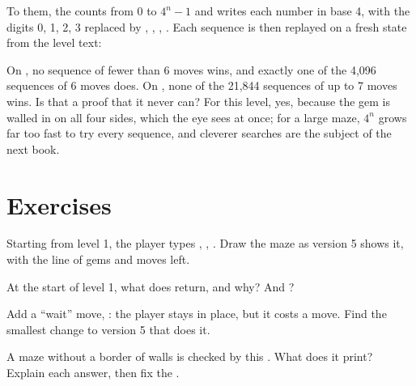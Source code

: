 To  them, the  counts from 0 to $4^n - 1$ and writes each number in
base 4, with the digits 0, 1, 2, 3 replaced by , , ,
. Each sequence is then replayed on a fresh state from the level text:

\label{lst:g9:project-grid-game:all}

\label{out:g9:project-grid-game:all}

On , no sequence of fewer than 6 moves wins, and exactly one of
the 4,096 sequences of 6 moves does. On , none of the 21,844
sequences of up to 7 moves wins. Is that a proof that it never can? For this
level, yes, because the gem is walled in on all four sides, which the eye sees
at once; for a large maze, $4^n$ grows far too fast to try every sequence, and
cleverer searches are the subject of the next book.

\section{Exercises}

\begin{exercise}[$\star$]\label{exo:g9:project-grid-game:1}
Starting from level 1, the player types , , . Draw the
maze as version 5 shows it, with the line of gems and moves left.
\end{exercise}

\begin{exercise}[$\star$]\label{exo:g9:project-grid-game:2}
At the start of level 1, what does  return, and why?
And ?
\end{exercise}

\begin{exercise}[$\star$]\label{exo:g9:project-grid-game:3}
Add a ``wait'' move, : the player stays in place, but it costs a move.
Find the smallest change to version 5 that does it.
\end{exercise}

\begin{exercise}[$\star$]\label{exo:g9:project-grid-game:4}
A maze without a border of walls is checked by this . What does it
print? Explain each answer, then fix the .

\label{lst:g9:project-grid-game:wrap-bug}
\end{exercise}


